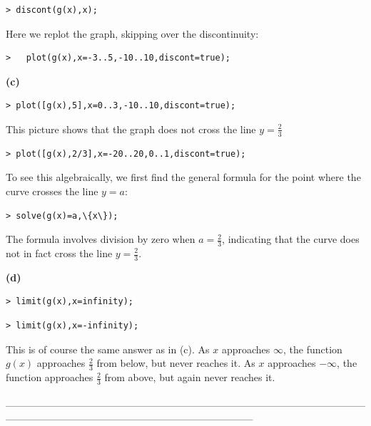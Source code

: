 \documentclass{article}
\begin{document}
\begin{lstlisting}
> discont(g(x),x);
\end{lstlisting}
\begin{Maple Normal}
Here we replot the graph, skipping over the discontinuity:
\end{Maple Normal}
\begin{lstlisting}
>   plot(g(x),x=-3..5,-10..10,discont=true);
\end{lstlisting}
\begin{Maple Normal}
\textbf{(c)}
\end{Maple Normal}
\begin{lstlisting}
> plot([g(x),5],x=0..3,-10..10,discont=true);
\end{lstlisting}
\begin{Maple Normal}
This picture shows that the graph does not cross the line 
$y =\frac{2}{3}$
\end{Maple Normal}
\begin{lstlisting}
> plot([g(x),2/3],x=-20..20,0..1,discont=true);
\end{lstlisting}
\begin{Maple Normal}
To see this algebraically, we first find the general formula for the point where the curve crosses the line 
$y =a$:
\end{Maple Normal}
\begin{lstlisting}
> solve(g(x)=a,\{x\});
\end{lstlisting}
\begin{Maple Normal}
The formula involves division by zero when 
$a =\frac{2}{3}$, indicating that the curve does not in fact cross the line 
$y =\frac{2}{3}$.
\end{Maple Normal}
\begin{Maple Normal}
\textbf{(d)}
\end{Maple Normal}
\begin{lstlisting}
> limit(g(x),x=infinity);
\end{lstlisting}
\begin{lstlisting}
> limit(g(x),x=-infinity);
\end{lstlisting}
\begin{Maple Normal}
This is of course the same answer as in (c).  As 
$x$ approaches 
$\infty$, the function 
$g (x)$ approaches 
$\frac{2}{3}$ from below, but never reaches it.  As 
$x$ approaches 
$-\infty$, the function approaches 
$\frac{2}{3}$ from above, but again never reaches it.
\end{Maple Normal}
\begin{Maple Normal}
\_\_\_\_\_\_\_\_\_\_\_\_\_\_\_\_\_\_\_\_\_\_\_\_\_\_\_\_\_\_\_\_\_\_\_\_\_\_\_\_\_\_\_\_\_\_\_\_\_\_\_\_\_\_\_\_\_\_\_\_\_\_\_\_\_\_\_\_\_\_\_\_\_\_\_\_\_\_\_\_\_
\end{Maple Normal}
\end{document}
